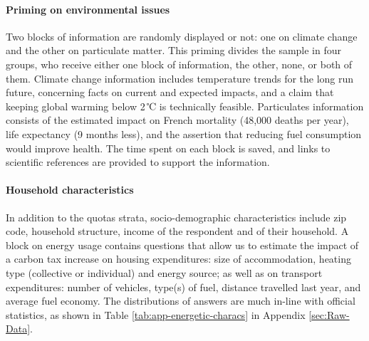 \documentclass[12pt]{article} %
\begin{document}
\paragraph{Priming on environmental issues}
Two blocks of information are randomly displayed or not: one on climate change and the other on particulate matter. This priming divides the sample in four groups, who receive either one block of information, the other, none, or both of them. Climate change information includes temperature trends for the long run future, concerning facts on current and expected impacts, and a claim that keeping global warming below 2\,℃ is technically feasible. Particulates information consists of the estimated impact on French mortality (48,000 deaths per year), life expectancy (9 months less), and the assertion that reducing fuel consumption would improve health. The time spent on each block is saved, and links to scientific references are provided to support the information.

\paragraph{Household characteristics}
In addition to the quotas strata, socio-demographic characteristics include zip code, household structure, income of the respondent and of their household. A block on energy usage contains questions that allow us to estimate the impact of a carbon tax increase on housing expenditures: size of accommodation, heating type (collective or individual) and energy source; as well as on transport expenditures: number of vehicles, type(s) of fuel, distance travelled last year, and average fuel economy. The distributions of answers are much in-line with official statistics, as shown in Table \ref{tab:app-energetic-characs} in Appendix \ref{sec:Raw-Data}.
\end{document}
